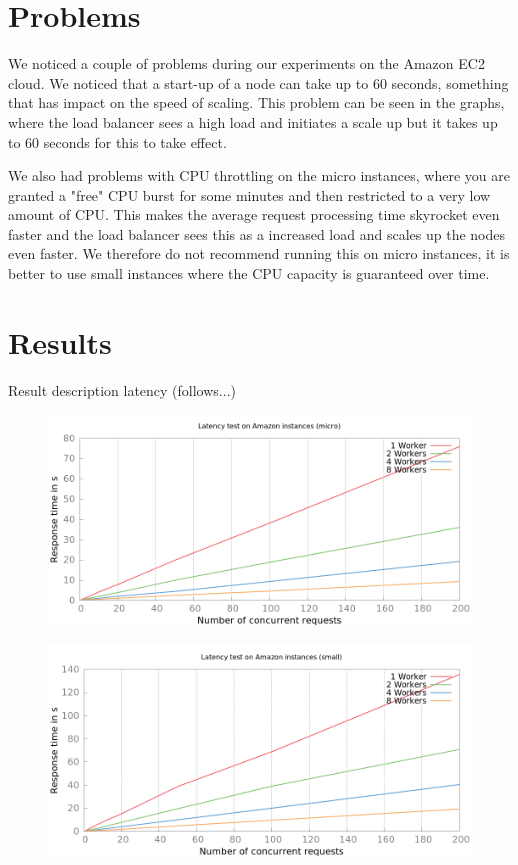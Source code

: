 \documentclass[paper=a4, fontsize=11pt]{scrartcl} %
\numberwithin{equation}{section} %
\numberwithin{figure}{section} %
\numberwithin{table}{section} %
\begin{document}
\section{Problems}
We noticed a couple of problems during our experiments on the Amazon EC2 cloud. We noticed that a start-up of a node can take up to 60 seconds, something that has impact on the speed of scaling. This problem can be seen in the graphs, where the load balancer sees a high load and initiates a scale up but it takes up to 60 seconds for this to take effect. 

We also had problems with CPU throttling on the micro instances, where you are granted a "free" CPU burst for some minutes and then restricted to a very low amount of CPU. This makes the average request processing time skyrocket even faster and the load balancer sees this as a increased load and scales up the nodes even faster. We therefore do not recommend running this on micro instances, it is better to use small instances where the CPU capacity is guaranteed over time.
\section{Results}

Result description latency (follows...)

\begin{figure}[h!]
\includegraphics[width=\columnwidth]{../plot/latency_fixed.png}
\end{figure}

\begin{figure}[h!]
\includegraphics[width=\columnwidth]{../plot/latency_fixed_small.png}
\end{figure}
\end{document}
